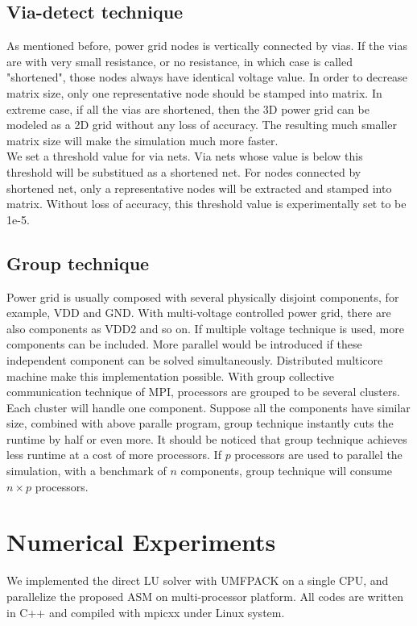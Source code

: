 \documentclass{sig-alternate}
\begin{document}
  \subsection{Via-detect technique}
	As mentioned before, power grid nodes is vertically connected by vias. If the vias are with very small resistance, or no 
	resistance, in which case is called "shortened", those nodes always have identical voltage value. In order to decrease matrix
	size, only one representative node should be stamped into matrix. In extreme case, if all the
	vias are shortened, then the 3D power grid can be modeled as a 2D grid without any loss of accuracy. The resulting much smaller 
	matrix size will make the simulation much more faster.\\ 
 
	We set a threshold value for via nets. Via nets whose value is below this threshold will be substitued as a shortened net. 
	For nodes connected by shortened net, only a representative nodes will be extracted and stamped into matrix. Without loss 
	of accuracy, this threshold value is experimentally set to be 1e-5.\\
 
  \subsection{Group technique} 
	Power grid is usually composed with several physically disjoint components, for example,
	VDD and GND. With multi-voltage controlled power grid, there are also components as VDD2 and so on. If multiple voltage 
	technique is used, more components can be included. More parallel would be introduced if these independent component can be solved 
	simultaneously. Distributed multicore machine make this implementation possible. With group collective communication technique of
	MPI, processors are grouped to be several clusters. Each cluster will handle one component. Suppose all the components have 
	similar size, combined with above paralle program, group technique instantly cuts the runtime by half or even more. 
	It should be noticed that group technique achieves less runtime at a cost of more processors. If $p$ processors are used to 
	parallel the simulation, with a benchmark of $n$ components, group technique will consume $n\times p$ processors. \\ 
 
\section{Numerical Experiments}
	We implemented the direct LU solver with UMFPACK on a single CPU, and parallelize the proposed ASM on multi-processor platform. 
	All codes are written in C++ and compiled with mpicxx under Linux system. 
\end{document}

